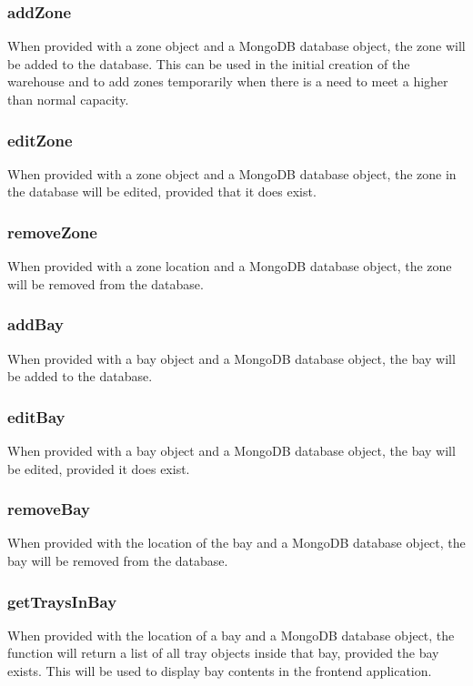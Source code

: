 \documentclass[letterpaper,10pt,english]{sphinxmanual}
\begin{document}
\subsubsection{addZone}
\label{\detokenize{docs/System_Overview/Backend_overview:addzone}}
When provided with a zone object and a MongoDB database object, the zone
will be added to the database. This can be used in the initial creation
of the warehouse and to add zones temporarily when there is a need to
meet a higher than normal capacity.


\subsubsection{editZone}
\label{\detokenize{docs/System_Overview/Backend_overview:editzone}}
When provided with a zone object and a MongoDB database object, the zone
in the database will be edited, provided that it does exist.


\subsubsection{removeZone}
\label{\detokenize{docs/System_Overview/Backend_overview:removezone}}
When provided with a zone location and a MongoDB database object, the
zone will be removed from the database.


\subsubsection{addBay}
\label{\detokenize{docs/System_Overview/Backend_overview:addbay}}
When provided with a bay object and a MongoDB database object, the bay
will be added to the database.


\subsubsection{editBay}
\label{\detokenize{docs/System_Overview/Backend_overview:editbay}}
When provided with a bay object and a MongoDB database object, the bay
will be edited, provided it does exist.


\subsubsection{removeBay}
\label{\detokenize{docs/System_Overview/Backend_overview:removebay}}
When provided with the location of the bay and a MongoDB database
object, the bay will be removed from the database.


\subsubsection{getTraysInBay}
\label{\detokenize{docs/System_Overview/Backend_overview:gettraysinbay}}
When provided with the location of a bay and a MongoDB database object,
the function will return a list of all tray objects inside that bay,
provided the bay exists. This will be used to display bay contents in
the front\sphinxhyphen{}end application.
\end{document}
